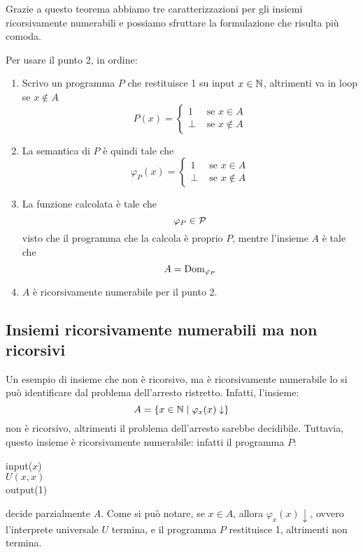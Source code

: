 Grazie a questo teorema abbiamo tre caratterizzazioni per gli insiemi ricorsivamente numerabili e possiamo sfruttare la formulazione che risulta più comoda.

Per usare il punto 2, in ordine:
\begin{enumerate}
	\item Scrivo un programma $P$ che restituisce 1 su input $x \in \mathbb{N}$, altrimenti va in loop se $x \notin A$
	$$
	P(x) = \begin{cases}
		1 & \text{ se } x \in A \\
		\bot & \text{ se } x \notin A
	\end{cases}
	$$
    
	\item La semantica di $P$ è quindi tale che
	$$
	\varphi_P (x) = \begin{cases}
		1 & \text{ se } x \in A \\
		\bot & \text{ se } x \notin A
	\end{cases}
	$$
	
    \item La funzione calcolata è tale che
	$$ \varphi_P \in \mathcal{P} $$
	visto che il programma che la calcola è proprio $P$, mentre l'insieme $A$ è tale che
	$$ A = \text{Dom}_{\varphi_P}$$
	
    \item $A$ è ricorsivamente numerabile per il punto 2.
\end{enumerate}

\subsection{Insiemi ricorsivamente numerabili ma non ricorsivi}

Un esempio di insieme che non è ricorsivo, ma è ricorsivamente numerabile lo si può identificare dal problema dell'arresto ristretto. Infatti, l'insieme:
$$ A = \{x \in \mathbb{N} \mid \varphi_x (x) \downarrow\}$$
non è ricorsivo, altrimenti il problema dell'arresto sarebbe decidibile. Tuttavia, questo insieme è ricorsivamente numerabile: infatti il programma $P$:

\begin{center}
	\vspace{1em}\hspace{5em}
	\begin{minipage}{.3\textwidth}
		\begin{tcolorbox}[
			colback=white,
			sharp corners,
			boxrule=.3mm,
			left=20pt,
			top=0pt,
			bottom=0pt,
			colbacktitle=white,
			coltitle=black
			]
			\begin{algorithm}[H]
				\SetAlgoNoEnd
				input($x$) \\
				$U(x,x)$ \\
				output(1)
			\end{algorithm}
		\end{tcolorbox}
	\end{minipage}
\end{center}
decide parzialmente $A$. Come si può notare, se $x \in A$, allora $\varphi_x (x) \downarrow$, ovvero l'interprete universale $U$ termina, e il programma $P$ restituisce 1, altrimenti non termina.

